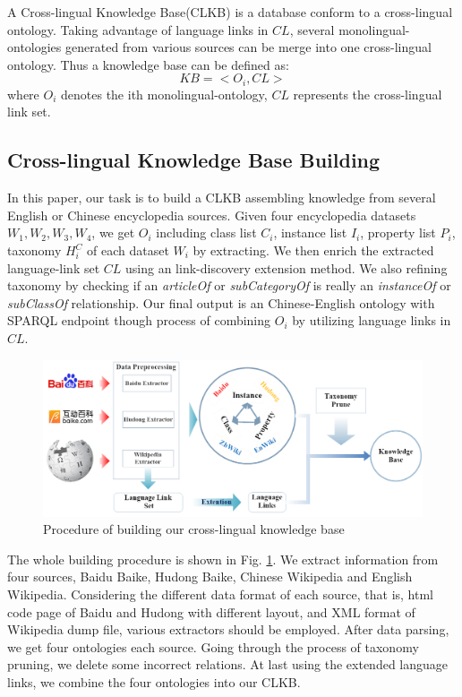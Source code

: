 \documentclass[runningheads,a4paper]{llncs}
\begin{document}
\begin{CJK*}{UTF8}{song}
A Cross-lingual Knowledge Base(CLKB) is a database conform to a cross-lingual ontology. Taking advantage of language links in $CL$, several monolingual-ontologies generated from various sources can be merge into one cross-lingual ontology.  Thus a knowledge base can be defined as:
\begin{equation}
    KB = <O_{i}, CL>
\end{equation}
where $O_{i}$ denotes the ith monolingual-ontology, $CL$ represents the cross-lingual link set.

\subsection{Cross-lingual Knowledge Base Building}

In this paper, our task is to build a CLKB assembling knowledge from several English or Chinese encyclopedia sources. Given four encyclopedia datasets $W_{1},W_{2},W_{3},W_{4}$, we get $O_{i}$ including class list $C_{i}$, instance list $I_{i}$, property list $P_{i}$, taxonomy $H^C_{i}$ of each dataset $W_{i}$ by extracting. We then enrich the extracted language-link set $CL$ using an link-discovery extension method. We also refining taxonomy by checking if an \textit{articleOf} or \textit{subCategoryOf} is really an \textit{instanceOf} or \textit{subClassOf} relationship. Our final output is an Chinese-English ontology with SPARQL endpoint though process of combining $O_{i}$ by utilizing language links in $CL$.
\vspace{-0.5cm}
\begin{figure}[ht]
    \centerline{\includegraphics[width=1\columnwidth]{fig/procedure2}}
    \caption{Procedure of building our cross-lingual knowledge base}
    \label{fig:procedure}
\end{figure}
\vspace{-0.5cm}

The whole building procedure is shown in Fig. \ref{fig:procedure}. We extract information from four sources, Baidu Baike, Hudong Baike, Chinese Wikipedia and English Wikipedia. Considering the different data format of each source, that is, html code page of Baidu and Hudong with different layout, and XML format of Wikipedia dump file, various extractors should be employed. After data parsing, we get four ontologies each source. Going through the process of taxonomy pruning, we delete some incorrect relations. At last using the extended language links, we combine the four ontologies into our CLKB.


\end{CJK*}
\end{document}

